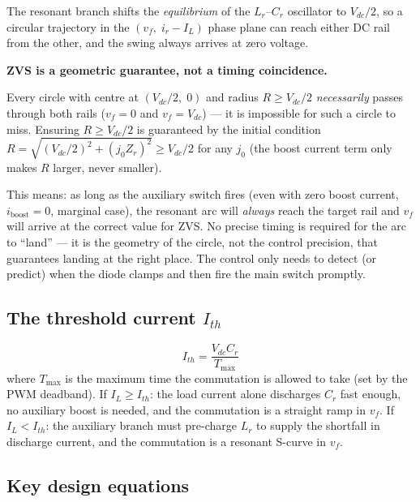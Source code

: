 \documentclass[12pt, a4paper]{article}
\def\,{ }%
\newcommand{\Vdc}{V_{dc}}
\newcommand{\vf}{v_f}
\newcommand{\IL}{I_L}
\newcommand{\Zr}{Z_r}
\newcommand{\Ith}{I_{th}}
\begin{document}
\begin{physbox}
The resonant branch shifts the \emph{equilibrium} of the $L_r$--$C_r$
oscillator to $V_{dc}/2$, so a circular trajectory in the
$(v_f,\; i_r - I_L)$ phase plane can reach either DC rail from the other,
and the swing always arrives at zero voltage.

\medskip
\textbf{ZVS is a geometric guarantee, not a timing coincidence.}

Every circle with centre at $(\Vdc/2,\;0)$ and radius $R \geq \Vdc/2$
\emph{necessarily} passes through both rails ($\vf = 0$ and $\vf = \Vdc$)
--- it is impossible for such a circle to miss.
Ensuring $R \geq \Vdc/2$ is guaranteed by the initial condition
$R = \sqrt{(\Vdc/2)^2 + (j_0\Zr)^2} \geq \Vdc/2$ for any $j_0$
(the boost current term only makes $R$ larger, never smaller).

This means: as long as the auxiliary switch fires (even with zero boost
current, $i_\text{boost} = 0$, marginal case), the resonant arc will
\emph{always} reach the target rail and $\vf$ will arrive at the correct
value for ZVS.
No precise timing is required for the arc to ``land'' --- it is the
geometry of the circle, not the control precision, that guarantees landing
at the right place.
The control only needs to detect (or predict) when the diode clamps and
then fire the main switch promptly.
\end{physbox}

\subsection*{The threshold current $\Ith$}

\begin{equation}
    \Ith = \frac{\Vdc\,C_r}{T_\text{max}}
    \label{eq:Ith_summary}
\end{equation}
where $T_\text{max}$ is the maximum time the commutation is allowed to
take (set by the PWM deadband).
If $\IL \geq \Ith$: the load current alone discharges $C_r$ fast enough,
no auxiliary boost is needed, and the commutation is a straight ramp
in $v_f$.
If $\IL < \Ith$: the auxiliary branch must pre-charge $L_r$ to supply the
shortfall in discharge current, and the commutation is a resonant S-curve
in $v_f$.

\subsection*{Key design equations}
\end{document}
